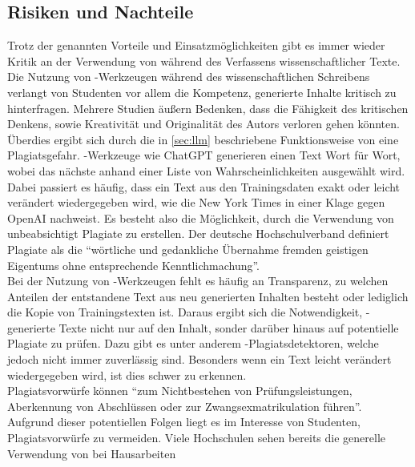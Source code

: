 \documentclass[../main.tex]{subfiles}
\begin{document}
\subsection{Risiken und Nachteile}
\label{sec:nachteile}

Trotz der genannten Vorteile und Einsatzmöglichkeiten gibt es immer wieder Kritik an der Verwendung von  während des Verfassens wissenschaftlicher Texte. 
Die Nutzung von -Werkzeugen während des wissenschaftlichen Schreibens verlangt von Studenten vor allem die Kompetenz, generierte Inhalte kritisch zu 
hinterfragen. Mehrere Studien äußern Bedenken, dass die Fähigkeit des kritischen Denkens, sowie Kreativität und Originalität des Autors verloren gehen könnten.\cite{ZukunftWissenschaftlichesPublizieren,teachers,BucherSchwarzerHolzwweißig}\\
Überdies ergibt sich durch die in \autoref{sec:llm} beschriebene Funktionsweise von  eine Plagiatsgefahr. -Werkzeuge wie ChatGPT generieren einen Text Wort für Wort, wobei das nächste anhand 
einer Liste von Wahrscheinlichkeiten ausgewählt wird. Dabei passiert es häufig, dass ein Text aus den Trainingsdaten exakt oder leicht verändert wiedergegeben wird, wie die New York Times in 
einer Klage gegen OpenAI nachweist\cite{NYTimes}. Es besteht also die Möglichkeit, durch die Verwendung von  unbeabsichtigt Plagiate zu erstellen. Der deutsche Hochschulverband definiert Plagiate als 
die "`wörtliche und gedankliche Übernahme fremden geistigen Eigentums ohne entsprechende Kenntlichmachung"'\cite{Hochschulverband}. \\ Bei der Nutzung von -Werkzeugen fehlt es häufig an Transparenz, 
zu welchen Anteilen der entstandene Text aus neu generierten Inhalten besteht oder lediglich die Kopie von Trainingstexten ist. Daraus ergibt sich die Notwendigkeit, -generierte Texte nicht nur 
auf den Inhalt, sonder darüber hinaus auf potentielle Plagiate zu prüfen. Dazu gibt es unter anderem -Plagiatsdetektoren, welche jedoch nicht immer zuverlässig sind. Besonders wenn ein Text 
leicht verändert wiedergegeben wird, ist dies schwer zu erkennen.\\ Plagiatsvorwürfe können "`zum Nichtbestehen von Prüfungsleistungen, Aberkennung von Abschlüssen  oder  zur  Zwangsexmatrikulation  
führen"'\cite{Plagiate}. Aufgrund dieser potentiellen Folgen liegt es im Interesse von Studenten, Plagiatsvorwürfe zu vermeiden. Viele Hochschulen sehen bereits die generelle Verwendung von  bei Hausarbeiten 
\end{document}
